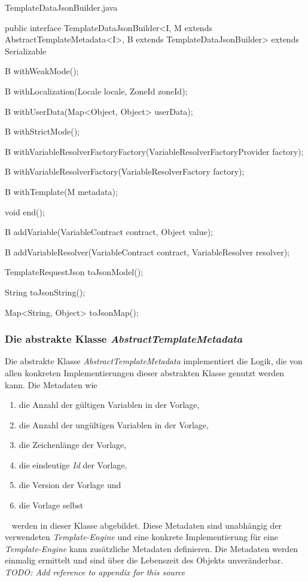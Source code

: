 \begin{program}[h]
\caption{TemplateDataJsonBuilder.java}
\label{prog:templateDataJsonBuilder}
\begin{JavaCode}
public interface TemplateDataJsonBuilder<I, 
                         M extends AbstractTemplateMetadata<I>, 
	                     B extends TemplateDataJsonBuilder> 
						 extends Serializable {

    B withWeakMode();

    B withLocalization(Locale locale,
                       ZoneId zoneId);

    B withUserData(Map<Object, Object> userData);

    B withStrictMode();

    B withVariableResolverFactoryFactory(VariableResolverFactoryProvider factory);

    B withVariableResolverFactory(VariableResolverFactory factory);

    B withTemplate(M metadata);

    void end();

    B addVariable(VariableContract contract,
                  Object value);

    B addVariableResolver(VariableContract contract,
                          VariableResolver resolver);

    TemplateRequestJson toJsonModel();

    String toJsonString();

    Map<String, Object> toJsonMap();
}
\end{JavaCode}
\end{program}

\subsubsection{Die abstrakte Klasse \emph{AbstractTemplateMetadata}}
\label{sec:abstractTemplateMetadata}
Die abstrakte Klasse \emph{AbstractTemplateMetadata} implementiert die Logik, die von allen konkreten Implementierungen dieser abstrakten Klasse genutzt werden kann. Die Metadaten wie
\begin{enumerate}
	\item die Anzahl der gültigen Variablen in der Vorlage,
	\item die Anzahl der ungültigen Variablen in der Vorlage,
	\item die Zeichenlänge der Vorlage,
	\item die eindeutige \emph{Id} der Vorlage,
	\item die Version der Vorlage und
	\item die Vorlage selbst
\end{enumerate}
\ \newline
werden in dieser Klasse abgebildet. Diese Metadaten sind unabhängig der verwendeten \emph{Template-Engine} und eine konkrete Implementierung für eine \emph{Template-Engine} kann zusätzliche Metadaten definieren. Die Metadaten werden einmalig ermittelt und sind über die Lebenszeit des Objekts unveränderbar. 
\newline
\newline
\emph{TODO: Add reference to appendix for this source}

